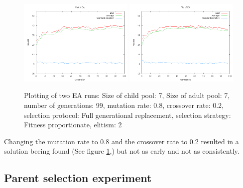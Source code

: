 \documentclass[11pt]{article}
\begin{document}
\begin{figure}[ht]
\begin{center}
\mbox{\includegraphics[width=0.49\textwidth]{images/41.png}}
\mbox{\includegraphics[width=0.49\textwidth]{images/42.png}}
\end{center}
\caption{Plotting of two EA runs:
Size of child pool: 7,
Size of adult pool: 7,
number of generations: 99,
mutation rate: 0.8,
crossover rate: 0.2,
selection protocol: Full generational replacement,
selection strategy: Fitness proportionate,
elitism: 2}
\label{fig:4}
\end{figure}
Changing the mutation rate to 0.8 and the crossover rate to 0.2 resulted in a solution
beeing found (See figure \ref{fig:4},) but not as early and not as consistently.

\subsection*{Parent selection experiment} %
\end{document}
